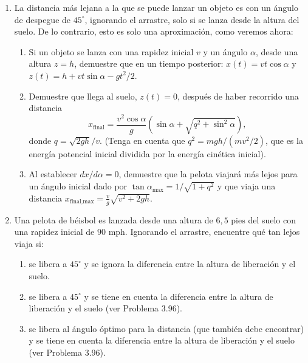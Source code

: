 \documentclass[12pt]{book}
\begin{document}
\begin{enumerate}
\item[3.96] La distancia más lejana a la que se puede lanzar un objeto es con un ángulo de despegue de $45^\circ$, ignorando el arrastre, solo si se lanza desde la altura del suelo. De lo contrario, esto es solo una aproximación, como veremos ahora:
\begin{enumerate}
\item[(a)] Si un objeto se lanza con una rapidez inicial $v$ y un ángulo $\alpha$, desde una altura $z = h$, demuestre que en un tiempo posterior: $x(t) = v t \cos \alpha$ y $z(t) = h + v t \sin \alpha - g t^2/2$.
\item[(b)] Demuestre que llega al suelo, $z(t) = 0$, después de haber recorrido una distancia \[ x_{\text{final}} = \frac{v^2 \cos \alpha}{g} \left( \sin \alpha + \sqrt{q^2 + \sin^2 \alpha} \right), \] donde $q = \sqrt{2gh}/v$. (Tenga en cuenta que $q^2 = mgh/(mv^2/2)$, que es la energía potencial inicial dividida por la energía cinética inicial).
\item[(c)] Al establecer $dx/d\alpha = 0$, demuestre que la pelota viajará más lejos para un ángulo inicial dado por $\tan \alpha_{\text{max}} = 1/\sqrt{1 + q^2}$ y que viaja una distancia $x_{\text{final,max}} = \frac{v}{g}\sqrt{v^2 + 2gh}$.
\end{enumerate}

\item[3.97] Una pelota de béisbol es lanzada desde una altura de $6{,}5\text{ pies}$ del suelo con una rapidez inicial de $90\text{ mph}$. Ignorando el arrastre, encuentre qué tan lejos viaja si:
\begin{enumerate}
\item[(a)] se libera a $45^\circ$ y se ignora la diferencia entre la altura de liberación y el suelo.
\item[(b)] se libera a $45^\circ$ y se tiene en cuenta la diferencia entre la altura de liberación y el suelo (ver Problema 3.96).
\item[(c)] se libera al ángulo óptimo para la distancia (que también debe encontrar) y se tiene en cuenta la diferencia entre la altura de liberación y el suelo (ver Problema 3.96).
\end{enumerate}


\end{enumerate}
\end{document}
